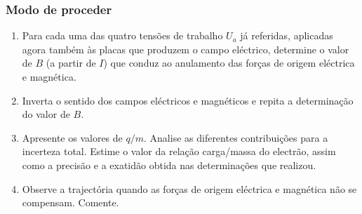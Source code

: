 \documentclass[a4paper,twoside,12pt]{article}      %
\begin{document}
\subsubsection{\sf Modo de proceder}
\begin{enumerate}
	\item Para cada uma das quatro tensões de trabalho $U_a$ já referidas, aplicadas agora também às placas que produzem o campo eléctrico, determine o valor de $B$ (a partir de $I$) que conduz ao anulamento das forças de origem eléctrica e magnética.
	\item Inverta o sentido dos campos eléctricos e magnéticos e repita a determinação do valor de $B$.
	\item Apresente os valores de $q/m$. Analise as diferentes contribuições para a incerteza total. Estime o valor da relação carga/massa do electrão, assim como a precisão e a exatidão obtida nas determinações que realizou.
	\item  Observe  a  trajectória  quando  as  forças  de 
origem eléctrica e magnética não se compensam. Comente. 
\end{enumerate}
\end{document}

